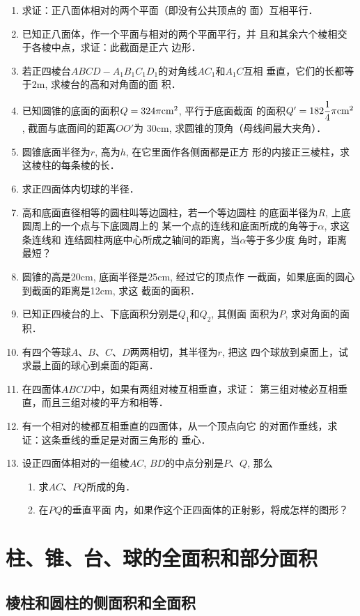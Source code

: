 \begin{enumerate}
\item 求证：正八面体相对的两个平面（即没有公共顶点的
面）互相平行．
\item 已知正八面体，作一个平面与相对的两个平面平行，并
且和其余六个棱相交于各棱中点，求证：此截面是正六
边形．
\item 若正四棱台$ABCD-A_1B_1C_1D_1$的对角线$AC_1$和$A_1C$互相
垂直，它们的长都等于2m, 求棱台的高和对角面的面
积．
\item 已知圆锥的底面的面积$Q=324\pi{\rm cm^2}$, 平行于底面截面
的面积$Q'=182\frac{1}{4}\pi{\rm cm^2}$, 截面与底面间的距离$OO'$为
30cm, 求圆锥的顶角（母线间最大夹角）．
\item 圆锥底面半径为$r$, 高为$h$, 在它里面作各侧面都是正方
形的内接正三棱柱，求这棱柱的每条棱的长．
\item 求正四面体内切球的半径．
\item 高和底面直径相等的圆柱叫等边圆柱，若一个等边圆柱
的底面半径为$R$, 上底圆周上的一个点与下底圆周上的
某一个点的连线和底面所成的角等于$\alpha$, 求这条连线和
连结圆柱两底中心所成之轴间的距离，当$\alpha$等于多少度
角时，距离最短？
\item 圆锥的高是20cm, 底面半径是25cm, 经过它的顶点作
一截面，如果底面的圆心到截面的距离是12cm, 求这
截面的面积．
\item 已知正四棱台的上、下底面积分别是$Q_1$和$Q_2$, 其侧面
面积为$P$, 求对角面的面积．
\item 有四个等球$A$、$B$、$C$、$D$两两相切，其半径为$r$, 把这
四个球放到桌面上，试求最上面的球心到桌面的距离．
\item 在四面体$ABCD$中，如果有两组对棱互相垂直，求证：
第三组对棱必互相垂直，而且三组对棱的平方和相等．
\item 有一个相对的棱都互相垂直的四面体，从一个顶点向它
的对面作垂线，求证：这条垂线的垂足是对面三角形的
垂心．
\item 设正四面体相对的一组棱$AC$, $BD$的中点分别是$P$、$Q$,
那么
\begin{enumerate}
\item 求$AC$、$PQ$所成的角．    
\item 在$PQ$的垂直平面
内，如果作这个正四面体的正射影，将成怎样的图形？
\end{enumerate}
\end{enumerate}

\section{柱、锥、台、球的全面积和部分面积}

\subsection{棱柱和圆柱的侧面积和全面积}

